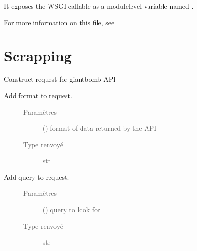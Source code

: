 \documentclass[letterpaper,10pt,french]{sphinxmanual}
\begin{document}
It exposes the WSGI callable as a module\sphinxhyphen{}level variable named .

For more information on this file, see


\chapter{Scrapping}
\label{\detokenize{scrapping:module-scrapping.construct_requests}}\label{\detokenize{scrapping:scrapping}}\label{\detokenize{scrapping::doc}}
Construct request for giantbomb API

\begin{fulllineitems}
\label{\detokenize{scrapping:scrapping.construct_requests.add_data_format}}
Add format to request.
\begin{quote}\begin{description}
\item[{Paramètres}] \leavevmode
{} () \textendash{} format of data returned by the API

\item[{Type renvoyé}] \leavevmode
str

\end{description}\end{quote}

\end{fulllineitems}


\begin{fulllineitems}
\label{\detokenize{scrapping:scrapping.construct_requests.add_query}}
Add query to request.
\begin{quote}\begin{description}
\item[{Paramètres}] \leavevmode
{} () \textendash{} query to look for

\item[{Type renvoyé}] \leavevmode
str

\end{description}\end{quote}

\end{fulllineitems}
\end{document}
